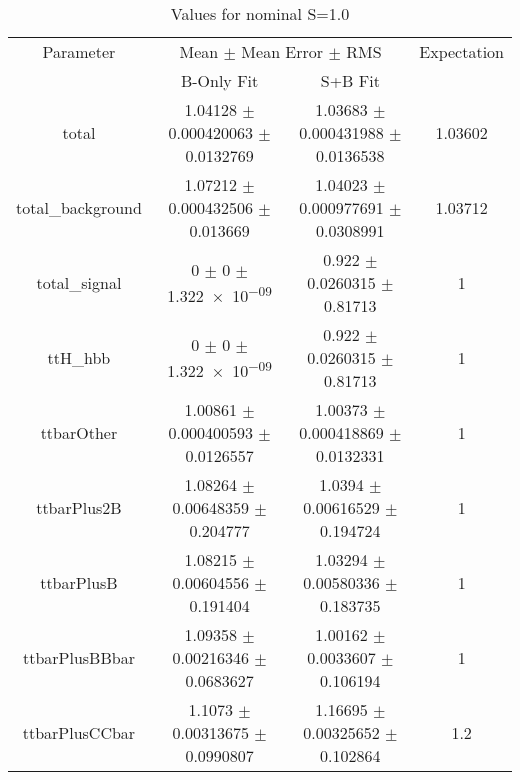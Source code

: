 \begin{table}
\centering
\caption{Values for nominal S=1.0}
\begin{tabular}{cccc}
\toprule
Parameter & \multicolumn{2}{c}{Mean $\pm$ Mean Error $\pm$ RMS} & Expectation\\
 & B-Only Fit & S+B Fit & \\
\midrule
total & \num{1.04128} $\pm$ \num{0.000420063} $\pm$ \num{0.0132769} & \num{1.03683} $\pm$ \num{0.000431988} $\pm$ \num{0.0136538} & \num{1.03602}\\
total\_background & \num{1.07212} $\pm$ \num{0.000432506} $\pm$ \num{0.013669} & \num{1.04023} $\pm$ \num{0.000977691} $\pm$ \num{0.0308991} & \num{1.03712}\\
total\_signal & \num{0} $\pm$ \num{0} $\pm$ \num{1.322e-09} & \num{0.922} $\pm$ \num{0.0260315} $\pm$ \num{0.81713} & \num{1}\\
ttH\_hbb & \num{0} $\pm$ \num{0} $\pm$ \num{1.322e-09} & \num{0.922} $\pm$ \num{0.0260315} $\pm$ \num{0.81713} & \num{1}\\
ttbarOther & \num{1.00861} $\pm$ \num{0.000400593} $\pm$ \num{0.0126557} & \num{1.00373} $\pm$ \num{0.000418869} $\pm$ \num{0.0132331} & \num{1}\\
ttbarPlus2B & \num{1.08264} $\pm$ \num{0.00648359} $\pm$ \num{0.204777} & \num{1.0394} $\pm$ \num{0.00616529} $\pm$ \num{0.194724} & \num{1}\\
ttbarPlusB & \num{1.08215} $\pm$ \num{0.00604556} $\pm$ \num{0.191404} & \num{1.03294} $\pm$ \num{0.00580336} $\pm$ \num{0.183735} & \num{1}\\
ttbarPlusBBbar & \num{1.09358} $\pm$ \num{0.00216346} $\pm$ \num{0.0683627} & \num{1.00162} $\pm$ \num{0.0033607} $\pm$ \num{0.106194} & \num{1}\\
ttbarPlusCCbar & \num{1.1073} $\pm$ \num{0.00313675} $\pm$ \num{0.0990807} & \num{1.16695} $\pm$ \num{0.00325652} $\pm$ \num{0.102864} & \num{1.2}\\
\bottomrule
\end{tabular}
\end{table}